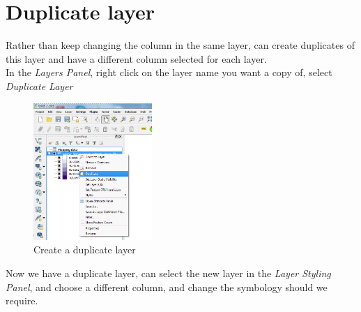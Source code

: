 




\section{Duplicate layer}

Rather than keep changing the column in the same layer, can create duplicates of this layer and have a different column selected for each layer.\\

In the \textit{Layers Panel}, right click on the layer name you want a copy of, select \textit{Duplicate Layer}

\begin{figure}[!h]
	\centering
	\includegraphics[width=0.4\textwidth]{images/duplicate_layer.png}
	\caption{Create a duplicate layer}
	\label{ft_fig_firstfig3}
\end{figure}

Now we have a duplicate layer, can select the new layer in the \textit{Layer Styling Panel}, and choose a different column, and change the symbology should we require.\\

